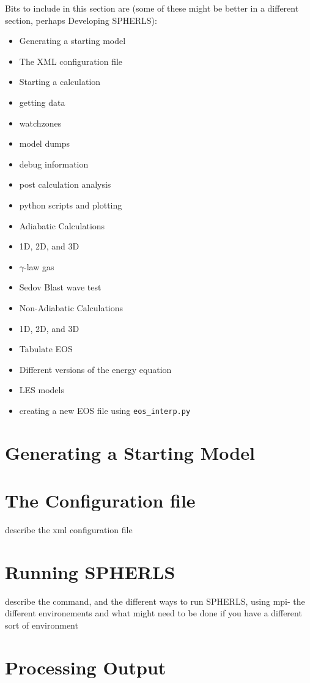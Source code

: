 \documentclass[12pt,a4paper]{book}
\begin{document}
Bits to include in this section are (some of these might be better in a different section, perhaps Developing SPHERLS):
\begin{itemize}
\item Generating a starting model
\item The XML configuration file
\item Starting a calculation
\item getting data
\item watchzones
\item model dumps
\item debug information
\item post calculation analysis
\item python scripts and plotting
\item Adiabatic Calculations
\item 1D, 2D, and 3D
\item $\gamma$-law gas
\item Sedov Blast wave test
\item Non-Adiabatic Calculations
\item 1D, 2D, and 3D
\item Tabulate EOS
\item Different versions of the energy equation
\item LES models
\item creating a new EOS file using {\tt eos\_interp.py}
\end{itemize}

\section{Generating a Starting Model}
\section{The Configuration file}
\label{sec:conf-file}
describe the xml configuration file
\section{Running SPHERLS}

describe the command, and the different ways to run SPHERLS, using mpi- the different environements and what might need to be done if you have a different sort of environment
\section{Processing Output}
\end{document}
